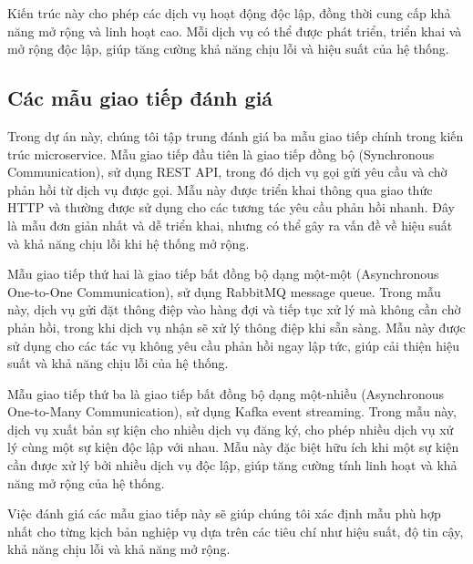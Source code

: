 Kiến trúc này cho phép các dịch vụ hoạt động độc lập, đồng thời cung cấp khả năng mở rộng và linh hoạt cao. Mỗi dịch vụ có thể được phát triển, triển khai và mở rộng độc lập, giúp tăng cường khả năng chịu lỗi và hiệu suất của hệ thống.

\subsection{Các mẫu giao tiếp đánh giá}
Trong dự án này, chúng tôi tập trung đánh giá ba mẫu giao tiếp chính trong kiến trúc microservice. Mẫu giao tiếp đầu tiên là giao tiếp đồng bộ (Synchronous Communication), sử dụng REST API, trong đó dịch vụ gọi gửi yêu cầu và chờ phản hồi từ dịch vụ được gọi. Mẫu này được triển khai thông qua giao thức HTTP và thường được sử dụng cho các tương tác yêu cầu phản hồi nhanh. Đây là mẫu đơn giản nhất và dễ triển khai, nhưng có thể gây ra vấn đề về hiệu suất và khả năng chịu lỗi khi hệ thống mở rộng.

Mẫu giao tiếp thứ hai là giao tiếp bất đồng bộ dạng một-một (Asynchronous One-to-One Communication), sử dụng RabbitMQ message queue. Trong mẫu này, dịch vụ gửi đặt thông điệp vào hàng đợi và tiếp tục xử lý mà không cần chờ phản hồi, trong khi dịch vụ nhận sẽ xử lý thông điệp khi sẵn sàng. Mẫu này được sử dụng cho các tác vụ không yêu cầu phản hồi ngay lập tức, giúp cải thiện hiệu suất và khả năng chịu lỗi của hệ thống.

Mẫu giao tiếp thứ ba là giao tiếp bất đồng bộ dạng một-nhiều (Asynchronous One-to-Many Communication), sử dụng Kafka event streaming. Trong mẫu này, dịch vụ xuất bản sự kiện cho nhiều dịch vụ đăng ký, cho phép nhiều dịch vụ xử lý cùng một sự kiện độc lập với nhau. Mẫu này đặc biệt hữu ích khi một sự kiện cần được xử lý bởi nhiều dịch vụ độc lập, giúp tăng cường tính linh hoạt và khả năng mở rộng của hệ thống.

Việc đánh giá các mẫu giao tiếp này sẽ giúp chúng tôi xác định mẫu phù hợp nhất cho từng kịch bản nghiệp vụ dựa trên các tiêu chí như hiệu suất, độ tin cậy, khả năng chịu lỗi và khả năng mở rộng.